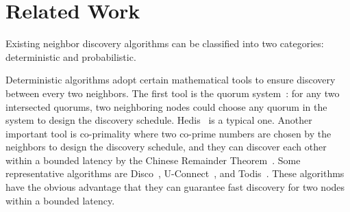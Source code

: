 \section{Related Work}
\label{RW}








Existing neighbor discovery algorithms can be classified into two
categories: deterministic and probabilistic.

Deterministic algorithms adopt certain mathematical tools to ensure
discovery between every two neighbors. The first tool is the quorum
system~\cite{luk1997two}: for any two intersected
quorums, two neighboring nodes could choose any quorum in the system to
design the discovery schedule. Hedis~\cite{chen2015heterogeneous} is a
typical one. Another important tool is co-primality where two co-prime
numbers are chosen by the neighbors to design the discovery schedule,
and they can discover each other within a bounded latency by the Chinese
Remainder Theorem~\cite{ding1996chinese}. Some representative algorithms
are Disco~\cite{dutta2008practical}, U-Connect~\cite{kandhalu2010u}, and
Todis~\cite{chen2015heterogeneous}. These algorithms have the obvious
advantage that they can guarantee fast discovery for two nodes within a
bounded latency.

